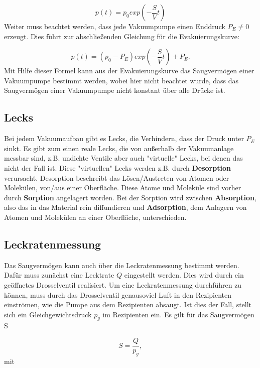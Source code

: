     \begin{equation}
    \label{equ:12}
        p(t) = p_0 exp \left(- \frac{S}{V}t \right)
    \end{equation}
Weiter muss beachtet werden, dass jede Vakuumpumpe einen Enddruck $P_E \neq 0$ erzeugt. 
Dies führt zur abschließenden Gleichung für die Evakuierungskurve:

    \begin{equation}
    \label{equ:13}
        p(t) = (p_0 - P_E) exp \left(- \frac{S}{V} t \right) + P_E.
    \end{equation}
Mit Hilfe dieser Formel kann aus der Evakuierungskurve das Saugvermögen einer Vakuumpumpe bestimmt werden,
wobei hier nicht beachtet wurde, dass das Saugvermögen einer Vakuumpumpe nicht konstant über alle Drücke ist.


\subsection{Lecks}
Bei jedem Vakuumaufbau gibt es Lecks, die Verhindern, dass der Druck unter $P_E$ sinkt.
Es gibt zum einen reale Lecks, die von außerhalb der Vakuumanlage messbar sind, z.B. undichte Ventile 
aber auch "virtuelle" \: Lecks, bei denen das nicht der Fall ist.
Diese "virtuellen" \: Lecks werden z.B. durch \textbf{Desorption} verursacht.
Desorption beschreibt das Lösen/Austreten von Atomen oder Molekülen, von/aus einer Oberfläche.
Diese Atome und Moleküle sind vorher durch \textbf{Sorption} angelagert worden.
Bei der Sorption wird zwischen \textbf{Absorption}, also das in das Material rein diffundieren und \textbf{Adsorption}, 
dem Anlagern von Atomen und Molekülen an einer Oberfläche, unterschieden\cite{Buch, S.62,63}.


\subsection{Leckratenmessung}
Das Saugvermögen kann auch über die Leckratenmessung bestimmt werden.
Dafür muss zunächst eine Lecktrate $Q$ eingestellt werden. Dies wird durch ein geöffnetes Drosselventil realisiert.
Um eine Leckratenmessung durchführen zu können, muss durch das Drosselventil genausoviel Luft in den Rezipienten einströmen, 
wie die Pumpe aus dem Rezipienten absaugt.
Ist dies der Fall, stellt sich ein Gleichgewichtsdruck $p_g$ im Rezipienten ein.
Es gilt für das Saugvermögen S

    \begin{equation}
    \label{equ:14}
        S = \frac{Q}{p_g},
    \end{equation}
mit

